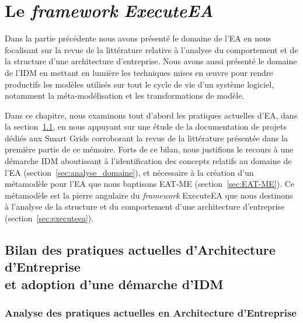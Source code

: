 \chapter{Le \emph{framework} \emph{ExecuteEA} }
\label{ch:proposition}

\PartialToc

Dans la partie précédente nous avons présenté le domaine de l'EA en nous focalisant
sur la revue de la littérature relative à l'analyse du comportement et de la structure d'une architecture d'entreprise. 
Nous avons aussi présenté le domaine de l'IDM en mettant en lumière les techniques
mises en œuvre pour rendre productifs les modèles utilisés sur tout le cycle de vie d'un système logiciel, notamment
la méta-modélisation et les transformations de modèle.

Dans ce chapitre, nous examinons tout d'abord les pratiques actuelles d'EA, dans la section~\ref{sec:bilan_ea},
en nous appuyant sur une étude de la documentation de projets dédiés aux Smart Grids
corroborant la revue de la littérature présentée dans la première partie de ce mémoire.
Forts de ce bilan, nous justifions le recours à une démarche IDM aboutissant à l'identification des concepts
relatifs au domaine de l'EA (section~\ref{sec:analyse_domaine}), et nécessaire à la création d'un métamodèle pour l'EA que nous
baptisons EAT-ME (section~\ref{sec:EAT-ME}). Ce métamodèle est la pierre angulaire du \emph{framework} ExecuteEA que nous
destinons à l'analyse de la structure et du comportement d'une architecture d'entreprise (section~\ref{sec:executeea}). 



\section[Bilan des pratiques actuelles d'EA et adoption d'une démarche IDM]%
        {Bilan des pratiques actuelles d'Architecture d'Entreprise \\
        et adoption d'une démarche d'IDM}
\label{sec:bilan_ea}

\subsection{Analyse des pratiques actuelles en Architecture d'Entreprise}

